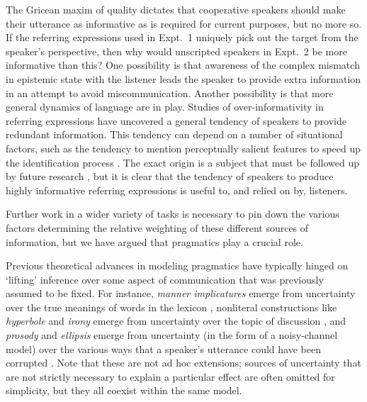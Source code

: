 \documentclass[manuscript]{stjour}
\begin{document}
The Gricean maxim of quality dictates that cooperative speakers should make their utterance as informative as is required for current purposes, but no more so. If the referring expressions used in Expt.~1 uniquely pick out the target from the speaker's perspective, then why would unscripted speakers in Expt.~2 be more informative than this? 
One possibility is that awareness of the complex mismatch in epistemic state with the listener leads the speaker to provide extra information in an attempt to avoid miscommunication.
Another possibility is that more general dynamics of language are in play.
Studies of over-informativity in referring expressions have uncovered a general tendency of speakers to provide redundant information.
This tendency can depend on a number of situational factors, such as the tendency to mention perceptually salient features to speed up the identification process  \cite{KoolenGattGoudbeekKrahmer11_Overspecification}. 
The exact origin is a subject that must be followed up by future research \cite[e.g.]{GannBarr14_AudienceDesign}, but it is clear that the tendency of speakers to produce highly informative referring expressions is useful to, and relied on by, listeners. 

Further work in a wider variety of tasks is necessary to pin down the various factors determining the relative weighting of these different sources of information, but we have argued that pragmatics play a crucial role.

Previous theoretical advances in modeling pragmatics have typically hinged on `lifting' inference over some aspect of communication that was previously assumed to be fixed. For instance, \emph{manner implicatures} emerge from uncertainty over the true meanings of words in the lexicon \cite{BergenLevyGoodman16_LexicalUncertainty}, nonliteral constructions like \emph{hyperbole} and \emph{irony} emerge from uncertainty over the topic of discussion \cite{KaoWuBergenGoodman14_NonliteralNumberWords}, and \emph{prosody} and \emph{ellipsis} emerge from uncertainty (in the form of a noisy-channel model) over the various ways that a speaker's utterance could have been corrupted  \cite{BergenGoodman15_StrategicUseOfNoise}. Note that these are not ad hoc extensions; sources of uncertainty that are not strictly necessary to explain a particular effect are often omitted for simplicity, but they all coexist within the same model. 
\end{document}

